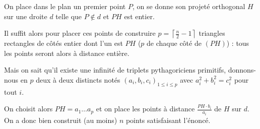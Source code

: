 On place dans le plan un premier point $P$, on se donne son projeté orthogonal $H$ sur une droite $d$ telle que $P\notin d$ et $PH$ est entier.

Il suffit alors pour placer ces points de construire $p = \left\lceil\frac n2 - 1\right\rceil$ triangles rectangles de côtés entier dont l'un est $PH$ ($p$ de chaque côté de $(PH)$) : tous les points seront alors à distance entière.

Mais on sait qu'il existe une infinité de triplets pythagoriciens primitifs, donnons-nous en $p$ deux à deux distincts notés $(a_i, b_i, c_i)_{1 \le i \le p}$ avec $a_i^2 + b_i^2 = c_i^2$ pour tout $i$.

On choisit alors $PH = a_1\dots a_p$ et on place les points à distance $\frac{PH\cdot b_i}{a_i}$ de $H$ sur $d$. On a donc bien construit (au moins) $n$ points satisfaisant l'énoncé.